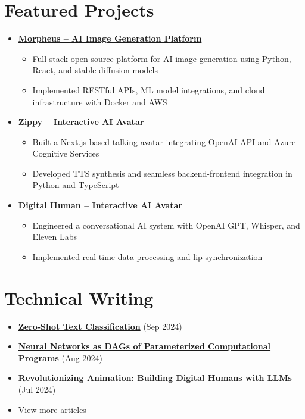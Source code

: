 \documentclass[letterpaper,11pt]{article}
\newcommand{\normalfaExternalLink}{{\mdseries\faExternalLink}}
\begin{document}
\section{Featured Projects}
\begin{itemize}[leftmargin=*, itemsep=1pt]
    \item \textbf{\href{https://github.com/Monadical-SAS/Morpheus}{Morpheus -- AI Image Generation Platform \normalfaExternalLink}}
    \begin{itemize}[itemsep=0pt]
        \item Full stack open-source platform for AI image generation using Python, React, and stable diffusion models
        \item Implemented RESTful APIs, ML model integrations, and cloud infrastructure with Docker and AWS
    \end{itemize}
    \item \textbf{\href{https://github.com/asanchezyali/ai-avatar}{Zippy -- Interactive AI Avatar \normalfaExternalLink}}
    \begin{itemize}[itemsep=0pt]
        \item Built a Next.js-based talking avatar integrating OpenAI API and Azure Cognitive Services
        \item Developed TTS synthesis and seamless backend-frontend integration in Python and TypeScript
    \end{itemize}
    \item \textbf{\href{https://github.com/asanchezyali/talking-avatar-with-ai}{Digital Human -- Interactive AI Avatar \normalfaExternalLink}}
    \begin{itemize}[itemsep=0pt]
        \item Engineered a conversational AI system with OpenAI GPT, Whisper, and Eleven Labs
        \item Implemented real-time data processing and lip synchronization
    \end{itemize}
\end{itemize}

\section{Technical Writing}
\begin{itemize}[leftmargin=*, itemsep=0pt]
    \item \textbf{\href{https://www.asanchezyali.com/blog/en/ai/20240917ZeroShot}{Zero-Shot Text Classification}} (Sep 2024)
    \item \textbf{\href{https://www.asanchezyali.com/blog/en/differentiable-programming/20240923DifferentiablePrograms}{Neural Networks as DAGs of Parameterized Computational Programs}} (Aug 2024)
    \item \textbf{\href{https://monadical.com/posts/build-a-digital-human-with-large-language-models.html}{Revolutionizing Animation: Building Digital Humans with LLMs}} (Jul 2024)
    \item \href{https://asanchezyali.com}{View more articles \normalfaExternalLink}
\end{itemize}
\end{document}
